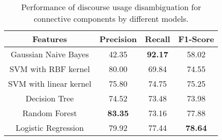 \begin{table}[ht]
\centering
\begin{tabular}{|c|c|c|c|}
\hline

\bf Features               & \bf Precision & \bf Recall & \bf F1-Score \\ \hline
    Gaussian Naive Bayes   &     42.35     & \bf 92.17  &     58.02    \\ \hline
    SVM with RBF kernel    &     80.00     &     69.84  &     74.55    \\ \hline
    SVM with linear kernel &     75.80     &     74.75  &     75.25    \\ \hline
    Decision Tree          &     74.52     &     73.48  &     73.98    \\ \hline
    Random Forest          & \bf 83.35     &     73.16  &     77.88    \\ \hline
    Logistic Regression    &     79.92     &     77.44  & \bf 78.64    \\ \hline

\end{tabular}
\caption{\label{t:recognition-models} Performance of discourse usage
disambiguation for connective components by different models. }
\end{table}

